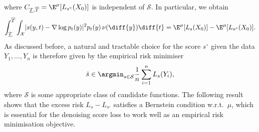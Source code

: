\documentclass[a4paper, 11pt, headings = small, abstract]{scrartcl}
\begin{document}
where $C_{\underline{T},\overline{T}} = \E^\mu[L_{s^\circ}(X_0)]$ is independent of $\mathcal{S}$. In particular, we obtain 
\begin{equation}\label{eq:equiv_denoise}
\int_{\underline{T}}^{\overline{T}} \int_{\mathcal{X}} \lvert s(y,t) - \nabla \log p_t(y) \rvert^2 p_t(y) \,\nu(\diff{y})  \diff{t} = \E^\mu[L_s(X_0)] - \E^\mu[L_{s^\circ}(X_0)].
\end{equation}
As discussed before, a natural and tractable choice for the score $s^\circ$ given the data $Y_1,\ldots,Y_n$ is therefore given by the empirical risk minimiser 
\[\hat{s} \in \argmin_{s \in \mathcal{S}} \frac{1}{n} \sum_{i=1}^n L_s(Y_i),\]
where $\mathcal{S}$ is some appropriate class of candidate functions. 
The following result shows that the excess risk $L_s - L_{s^\circ}$ satisfies a Bernstein condition w.r.t.\ $\mu$, which is essential for the denoising score loss to work well as an empirical risk minimisation objective.
\end{document}
